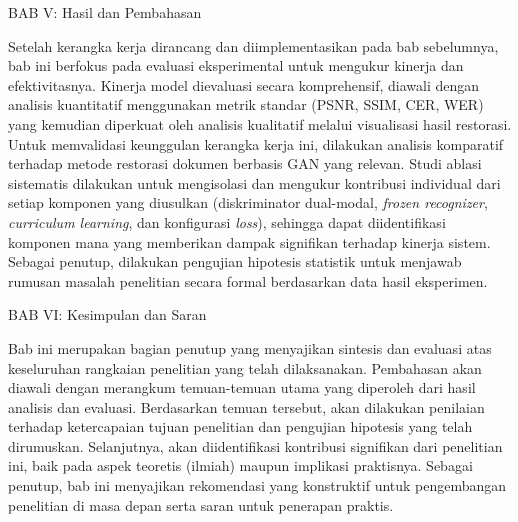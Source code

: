 \documentclass[12pt,a4paper]{article}
\begin{document}
\vspace{0.5em}
BAB V: Hasil dan Pembahasan

Setelah kerangka kerja dirancang dan diimplementasikan pada bab sebelumnya, bab ini berfokus pada evaluasi eksperimental untuk mengukur kinerja dan efektivitasnya. Kinerja model dievaluasi secara komprehensif, diawali dengan analisis kuantitatif menggunakan metrik standar (PSNR, SSIM, CER, WER) yang kemudian diperkuat oleh analisis kualitatif melalui visualisasi hasil restorasi. Untuk memvalidasi keunggulan kerangka kerja ini, dilakukan analisis komparatif terhadap metode restorasi dokumen berbasis GAN yang relevan. Studi ablasi sistematis dilakukan untuk mengisolasi dan mengukur kontribusi individual dari setiap komponen yang diusulkan (diskriminator dual-modal, \textit{frozen recognizer}, \textit{curriculum learning}, dan konfigurasi \textit{loss}), sehingga dapat diidentifikasi komponen mana yang memberikan dampak signifikan terhadap kinerja sistem. Sebagai penutup, dilakukan pengujian hipotesis statistik untuk menjawab rumusan masalah penelitian secara formal berdasarkan data hasil eksperimen.

\vspace{0.5em}
BAB VI: Kesimpulan dan Saran

Bab ini merupakan bagian penutup yang menyajikan sintesis dan evaluasi atas keseluruhan rangkaian penelitian yang telah dilaksanakan. Pembahasan akan diawali dengan merangkum temuan-temuan utama yang diperoleh dari hasil analisis dan evaluasi. Berdasarkan temuan tersebut, akan dilakukan penilaian terhadap ketercapaian tujuan penelitian dan pengujian hipotesis yang telah dirumuskan. Selanjutnya, akan diidentifikasi kontribusi signifikan dari penelitian ini, baik pada aspek teoretis (ilmiah) maupun implikasi praktisnya. Sebagai penutup, bab ini menyajikan rekomendasi yang konstruktif untuk pengembangan penelitian di masa depan serta saran untuk penerapan praktis.


\end{document}
